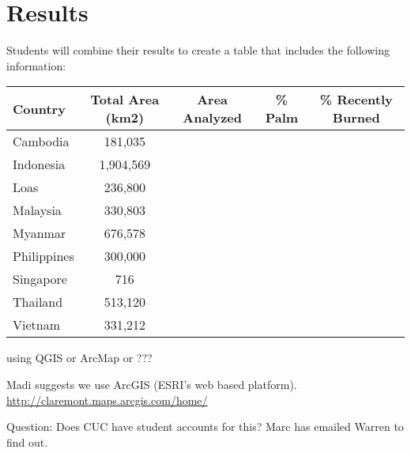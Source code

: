 \documentclass{article}\usepackage[]{graphicx}\usepackage[]{color}
\begin{document}
\section{Results}

Students will combine their results to create a table that includes the following information:

\begin{table}[h]
\begin{tabular}{lcccc} \hline
Country   & Total Area (km2)  & Area Analyzed  & \% Palm & \% Recently Burned \\ \hline\hline

Cambodia & 181,035 &&& \\
Indonesia   & 1,904,569 & & & \\
Loas & 236,800 &&&\\
Malaysia   & 330,803 & & & \\
Myanmar & 	676,578 &&& \\
Philippines   & 300,000 & & & \\
Singapore & 	716 &&& \\
Thailand    & 513,120 &&& \\
Vietnam   & 331,212 & & & \\
\hline


\end{tabular}
\end{table}

using QGIS or ArcMap or ???

Madi suggests we use ArcGIS (ESRI's web based platform). \url{http://claremont.maps.arcgis.com/home/}

Question: Does CUC have student accounts for this?  Marc has emailed Warren to find out.
\end{document}
